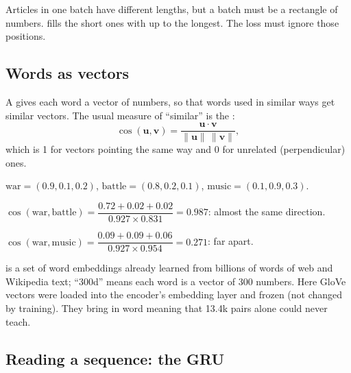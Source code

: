 \begin{definition}[Padding]
Articles in one batch have different lengths, but a batch must be a rectangle of numbers.  fills the short ones with  up to the longest. The loss must ignore those positions.
\end{definition}

\subsection*{Words as vectors}

\begin{definition}
A  gives each word a vector of numbers, so that words used in similar ways get similar vectors. The usual measure of ``similar'' is the :
\[
\cos(\mathbf{u}, \mathbf{v}) = \frac{\mathbf{u}\cdot\mathbf{v}}{\lVert \mathbf{u}\rVert\,\lVert \mathbf{v}\rVert},
\]
which is 1 for vectors pointing the same way and 0 for unrelated (perpendicular) ones.
\end{definition}

\begin{example}
$\text{war} = (0.9, 0.1, 0.2)$, $\text{battle} = (0.8, 0.2, 0.1)$, $\text{music} = (0.1, 0.9, 0.3)$.
\begin{steps}
  \item $\cos(\text{war}, \text{battle}) = \dfrac{0.72 + 0.02 + 0.02}{0.927 \times 0.831} = 0.987$: almost the same direction.
  \item $\cos(\text{war}, \text{music}) = \dfrac{0.09 + 0.09 + 0.06}{0.927 \times 0.954} = 0.271$: far apart.
\end{steps}
\end{example}

\begin{definition}[GloVe-300d]
 is a set of word embeddings already learned from billions of words of web and Wikipedia text; ``300d'' means each word is a vector of 300 numbers. Here GloVe vectors were loaded into the encoder's embedding layer and frozen (not changed by training). They bring in word meaning that 13.4k pairs alone could never teach.
\end{definition}

\subsection*{Reading a sequence: the GRU}

